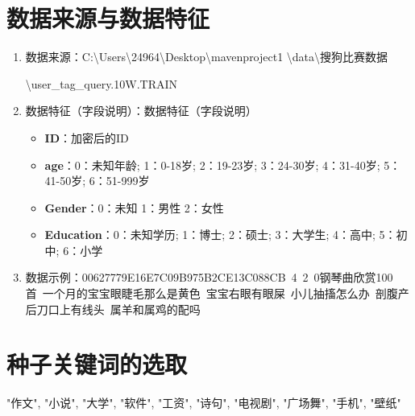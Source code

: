 \documentclass[12pt, a4paper, oneside]{ctexbook}
\begin{document}
\section{数据来源与数据特征}
\begin{enumerate}
    \item 数据来源：C:\textbackslash Users\textbackslash 24964\textbackslash Desktop\textbackslash mavenproject1 \textbackslash data\textbackslash 搜狗比赛数据
    
    \textbackslash user\_tag\_query.10W.TRAIN
    \item 数据特征（字段说明）：数据特征（字段说明）
    \begin{itemize}
        \item \textbf{ID}：加密后的ID
        \item \textbf{age}：0：未知年龄; 1：0-18岁; 2：19-23岁; 3：24-30岁; 4：31-40岁; 5：41-50岁; 6：51-999岁
        \item \textbf{Gender}：0：未知 1：男性 2：女性
        \item \textbf{Education}：0：未知学历; 1：博士; 2：硕士; 3：大学生; 4：高中; 5：初中; 6：小学
    \end{itemize}
    \item 数据示例：00627779E16E7C09B975B2CE13C088CB\ 4\ 2\ 0钢琴曲欣赏100首\ 一个月的宝宝眼睫毛那么是黄色\ 宝宝右眼有眼屎\ 小儿抽搐怎么办\ 剖腹产后刀口上有线头\ 属羊和属鸡的配吗
\end{enumerate}
\section{种子关键词的选取}
"作文", "小说", "大学", "软件", "工资", "诗句", "电视剧", "广场舞", "手机", "壁纸"
\end{document}
